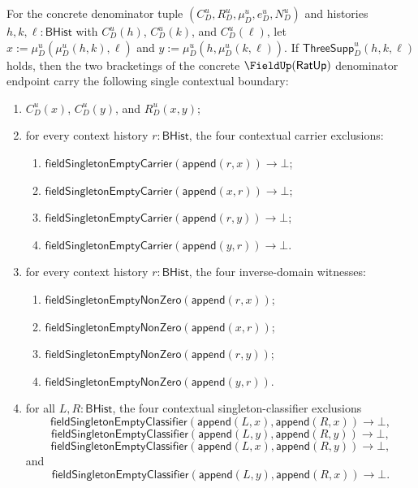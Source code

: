\begin{theorem}
\label{thm:ratup-fieldup-bracketing-independent-full-crossed-contextual-boundary}
For the concrete denominator tuple $(C_D^u,R_D^u,\mu_D^u,e_D^u,N_D^u)$ and
histories $h,k,\ell:\mathsf{BHist}$ with $C_D^u(h)$, $C_D^u(k)$, and
$C_D^u(\ell)$, let $x:=\mu_D^u(\mu_D^u(h,k),\ell)$ and
$y:=\mu_D^u(h,\mu_D^u(k,\ell))$. If
$\mathsf{ThreeSupp}_D^u(h,k,\ell)$ holds, then the two bracketings of the
concrete $\FieldUp(\mathsf{RatUp})$ denominator endpoint carry the following
single contextual boundary:
\begin{enumerate}
  \item $C_D^u(x)$, $C_D^u(y)$, and $R_D^u(x,y)$;
  \item for every context history $r:\mathsf{BHist}$, the four contextual
  carrier exclusions:
  \begin{enumerate}
    \item $\mathsf{fieldSingletonEmptyCarrier}(\mathsf{append}(r,x))\to\bot$;
    \item $\mathsf{fieldSingletonEmptyCarrier}(\mathsf{append}(x,r))\to\bot$;
    \item $\mathsf{fieldSingletonEmptyCarrier}(\mathsf{append}(r,y))\to\bot$;
    \item $\mathsf{fieldSingletonEmptyCarrier}(\mathsf{append}(y,r))\to\bot$.
  \end{enumerate}
  \item for every context history $r:\mathsf{BHist}$, the four inverse-domain
  witnesses:
  \begin{enumerate}
    \item $\mathsf{fieldSingletonEmptyNonZero}(\mathsf{append}(r,x))$;
    \item $\mathsf{fieldSingletonEmptyNonZero}(\mathsf{append}(x,r))$;
    \item $\mathsf{fieldSingletonEmptyNonZero}(\mathsf{append}(r,y))$;
    \item $\mathsf{fieldSingletonEmptyNonZero}(\mathsf{append}(y,r))$.
  \end{enumerate}
  \item for all $L,R:\mathsf{BHist}$, the four contextual
  singleton-classifier exclusions
  $$
  \mathsf{fieldSingletonEmptyClassifier}(\mathsf{append}(L,x),\mathsf{append}(R,x))
  \to\bot,
  $$
  $$
  \mathsf{fieldSingletonEmptyClassifier}(\mathsf{append}(L,y),\mathsf{append}(R,y))
  \to\bot,
  $$
  $$
  \mathsf{fieldSingletonEmptyClassifier}(\mathsf{append}(L,x),\mathsf{append}(R,y))
  \to\bot,
  $$
  and
  $$
  \mathsf{fieldSingletonEmptyClassifier}(\mathsf{append}(L,y),\mathsf{append}(R,x))
  \to\bot.
  $$
\end{enumerate}
\end{theorem}
